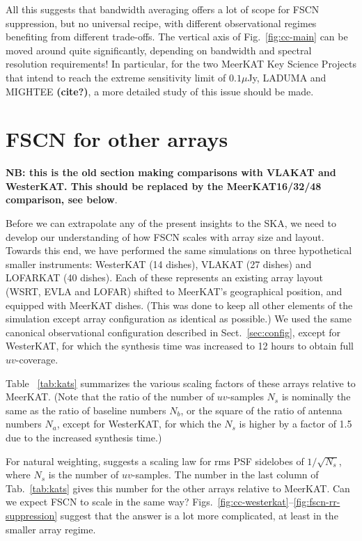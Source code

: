 \documentclass{aa}
\begin{document}
All this suggests that bandwidth averaging offers a lot of scope for FSCN suppression, but no universal recipe, with different observational regimes benefiting from different trade-offs. The vertical axis of Fig.~\ref{fig:cc-main} can be moved around quite significantly, depending on bandwidth and spectral resolution requirements! In particular, for the two MeerKAT Key Science Projects that intend to reach the extreme sensitivity limit of $0.1\mu$Jy, LADUMA and MIGHTEE {\bf (cite?)}, a more detailed study of this issue should be made.

\section{FSCN for other arrays}
\label{sec:other-arrays}

{\bf NB: this is the old section making comparisons with VLAKAT and WesterKAT. This should be replaced by the MeerKAT16/32/48 comparison, see below}.

Before we can extrapolate any of the present insights to the SKA, we need to develop our understanding of how FSCN scales with array size and layout. Towards this end, we have performed the same simulations on three hypothetical smaller instruments: WesterKAT (14 dishes), VLAKAT (27 dishes) and LOFARKAT (40 dishes). Each of these represents an existing array layout (WSRT, EVLA and LOFAR) shifted to MeerKAT's geographical position, and equipped with MeerKAT dishes. (This was done to keep all other elements of the simulation except array configuration as identical as possible.) We used the same canonical observational configuration described in Sect.~\ref{sec:config}, except for WesterKAT, for which the synthesis time was increased to 12 hours to obtain full $uv$-coverage. 

Table ~\ref{tab:kats} summarizes the various scaling factors of these arrays relative to MeerKAT. (Note that the ratio of the number of $uv$-samples $N_s$ is nominally the same as the ratio of baseline numbers $N_b$, or the square of the ratio of antenna numbers $N_a$, except for WesterKAT, for which the $N_s$ is higher by a factor of 1.5 due to the increased synthesis time.) 

For natural weighting, \citet{SKA49} suggests a scaling law for rms PSF sidelobes of $1/\sqrt{N_s}$, where $N_s$ is the number of $uv$-samples. The number in the last column of Tab.~\ref{tab:kats} gives this number for the other arrays relative to MeerKAT. Can we expect FSCN to scale in the same way? Figs.~\ref{fig:cc-westerkat}--\ref{fig:fscn-rr-suppression} suggest that the answer is a lot more complicated, at least in the smaller array regime. 
\end{document}
